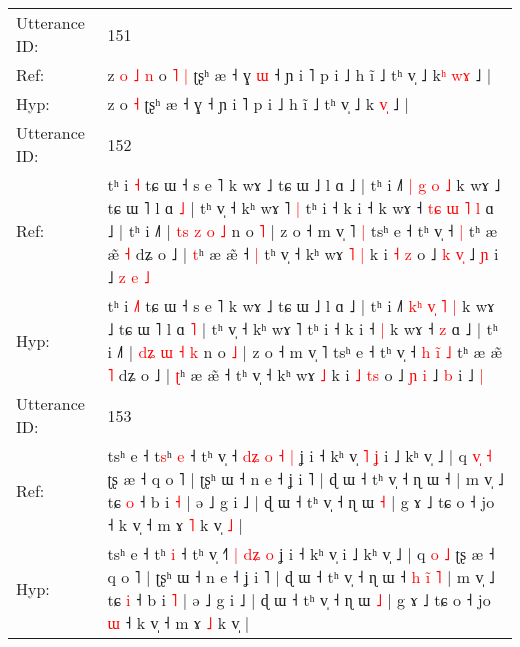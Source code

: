 \documentclass[10pt]{article}
\DeclareRobustCommand{\hl}[1]{{\textcolor{red}{#1}}}
\begin{document}
\begin{longtable}{ll}
 \\
\midrule
Utterance ID: & 151 \\
Ref: & z\hl{ }\hl{o}\hl{ }\hl{˩}\hl{ }\hl{n} o\hl{ }\hl{˥} \hl{|} ʈʂʰ æ ˧ ɣ\hl{ }\hl{ɯ} ˧ ɲ i ˥ p i ˩ h ĩ ˩ tʰ v̩ ˩ k\hl{ʰ} \hl{w}\hl{ɤ} ˩ |
 \\
Hyp: & z\hl{}\hl{}\hl{}\hl{}\hl{}\hl{} o\hl{}\hl{} \hl{˧} ʈʂʰ æ ˧ ɣ\hl{}\hl{} ˧ ɲ i ˥ p i ˩ h ĩ ˩ tʰ v̩ ˩ k\hl{} \hl{v}\hl{̩} ˩ |
 \\
\midrule
Utterance ID: & 152 \\
Ref: & tʰ i \hl{}\hl{˧} tɕ ɯ ˧ s e ˥ k wɤ ˩ tɕ ɯ ˩ l ɑ ˩ | tʰ i ˩˥ \hl{}\hl{|} \hl{}\hl{g} \hl{o} \hl{˩} k wɤ ˩ tɕ ɯ ˥ l ɑ \hl{˩} | tʰ v̩ ˧ kʰ wɤ ˥\hl{ }\hl{|} tʰ i ˧ k i ˧\hl{}\hl{} k wɤ ˧\hl{ }\hl{t}\hl{ɕ}\hl{ }\hl{ɯ}\hl{ }\hl{˥} \hl{l} ɑ ˩ | tʰ i ˩˥ | \hl{t}\hl{s} \hl{z} \hl{o} \hl{˩} n o \hl{˥} | z o ˧ m v̩ ˥\hl{ }\hl{|} tsʰ e ˧ tʰ v̩ ˧\hl{}\hl{}\hl{}\hl{}\hl{} \hl{|} tʰ æ æ̃ \hl{˧} dʑ o ˩ | \hl{t}ʰ æ æ̃ ˧\hl{ }\hl{|} tʰ v̩ ˧ kʰ wɤ\hl{ }\hl{˥} \hl{|} k i \hl{˧} \hl{}\hl{z} o ˩ \hl{k} \hl{v}\hl{̩} ˩ \hl{ɲ} i ˩\hl{ }\hl{z}\hl{ }\hl{e} \hl{˩}
 \\
Hyp: & tʰ i \hl{˩}\hl{˥} tɕ ɯ ˧ s e ˥ k wɤ ˩ tɕ ɯ ˩ l ɑ ˩ | tʰ i ˩˥ \hl{k}\hl{ʰ} \hl{v}\hl{̩} \hl{˥} \hl{|} k wɤ ˩ tɕ ɯ ˥ l ɑ \hl{˥} | tʰ v̩ ˧ kʰ wɤ ˥\hl{}\hl{} tʰ i ˧ k i ˧\hl{ }\hl{|} k wɤ ˧\hl{}\hl{}\hl{}\hl{}\hl{}\hl{}\hl{} \hl{z} ɑ ˩ | tʰ i ˩˥ | \hl{d}\hl{ʑ} \hl{ɯ} \hl{˧} \hl{k} n o \hl{˩} | z o ˧ m v̩ ˥\hl{}\hl{} tsʰ e ˧ tʰ v̩ ˧\hl{ }\hl{h}\hl{ }\hl{i}\hl{̃} \hl{˩} tʰ æ æ̃ \hl{˥} dʑ o ˩ | \hl{ʈ}ʰ æ æ̃ ˧\hl{}\hl{} tʰ v̩ ˧ kʰ wɤ\hl{}\hl{} \hl{˩} k i \hl{˩} \hl{t}\hl{s} o ˩ \hl{ɲ} \hl{}\hl{i} ˩ \hl{b} i ˩\hl{}\hl{}\hl{}\hl{} \hl{|}
 \\
\midrule
Utterance ID: & 153 \\
Ref: & tsʰ e ˧ t\hl{s}ʰ \hl{e} ˧ tʰ v̩ ˧\hl{ }\hl{d}\hl{ʑ} \hl{o}\hl{ }\hl{˧} \hl{|} ʝ i ˧ kʰ v̩\hl{ }\hl{˥}\hl{ }\hl{ʝ} i ˩ kʰ v̩ ˩ | q \hl{v}\hl{̩} \hl{˧} ʈʂ æ ˧ q o ˥ | ʈʂʰ ɯ ˧ n e ˧ ʝ i ˥ | ɖ ɯ ˧ tʰ v̩ ˧ ɳ ɯ ˧\hl{}\hl{}\hl{}\hl{}\hl{}\hl{}\hl{} | m v̩ ˩ tɕ \hl{o} ˧ b i \hl{˧} | ə ˩ g i ˩ | ɖ ɯ ˧ tʰ v̩ ˧ ɳ ɯ \hl{˧} | g ɤ ˩ tɕ o ˧ jo\hl{}\hl{} ˧ k v̩ ˧ m ɤ \hl{˥} k v̩\hl{ }\hl{˩} |
 \\
Hyp: & tsʰ e ˧ t\hl{}ʰ \hl{i} ˧ tʰ v̩ ˧\hl{˥}\hl{ }\hl{|} \hl{}\hl{d}\hl{ʑ} \hl{o} ʝ i ˧ kʰ v̩\hl{}\hl{}\hl{}\hl{} i ˩ kʰ v̩ ˩ | q \hl{}\hl{o} \hl{˩} ʈʂ æ ˧ q o ˥ | ʈʂʰ ɯ ˧ n e ˧ ʝ i ˥ | ɖ ɯ ˧ tʰ v̩ ˧ ɳ ɯ ˧\hl{ }\hl{h}\hl{ }\hl{i}\hl{̃}\hl{ }\hl{˥} | m v̩ ˩ tɕ \hl{i} ˧ b i \hl{˥} | ə ˩ g i ˩ | ɖ ɯ ˧ tʰ v̩ ˧ ɳ ɯ \hl{˩} | g ɤ ˩ tɕ o ˧ jo\hl{ }\hl{ɯ} ˧ k v̩ ˧ m ɤ \hl{˩} k v̩\hl{}\hl{} |

\end{longtable}
\end{document}
